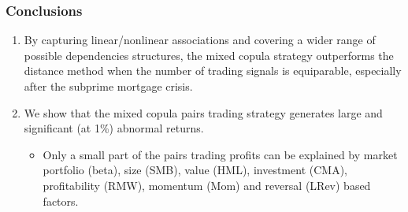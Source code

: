 \documentclass[pdf,9pt,xcolor=dvipsnames,hide notes]{beamer}
\begin{document}
\begin{frame}[label=frame5b2]
\frametitle{Conclusions}


\begin{enumerate}
	\justifying
	
	
	\item By capturing linear/nonlinear associations and covering a wider range of possible dependencies structures, the mixed copula strategy outperforms the distance method when the number of trading signals is equiparable, especially after the subprime mortgage crisis.
	
	\pause
	\vspace{0.3cm}
	
	\item We show that the mixed copula pairs trading strategy generates large and significant (at 1\%) abnormal returns.
	
	\pause
		\begin{itemize}
			\item Only a small part of the pairs trading profits can be explained by market portfolio (beta), size (SMB), value (HML), investment (CMA), profitability (RMW), momentum (Mom) and reversal (LRev) based factors.
		\end{itemize}
	
	
	
\end{enumerate}

\end{frame}
\end{document}
